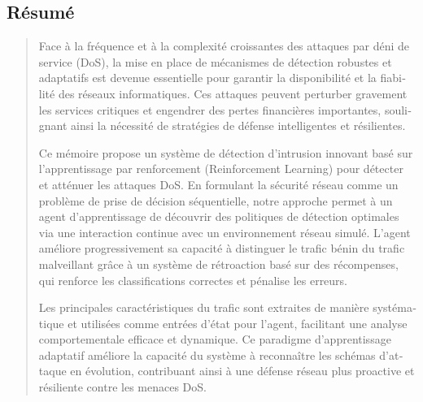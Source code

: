 \documentclass[16pt]{report}
\begin{document}
\newpage
\begin{otherlanguage}{french}
\chapter*{Résumé}

\begin{quote}
\large
Face à la fréquence et à la complexité croissantes des attaques par déni de service (DoS), la mise en place de mécanismes de détection robustes et adaptatifs est devenue essentielle pour garantir la disponibilité et la fiabilité des réseaux informatiques. Ces attaques peuvent perturber gravement les services critiques et engendrer des pertes financières importantes, soulignant ainsi la nécessité de stratégies de défense intelligentes et résilientes.

Ce mémoire propose un système de détection d’intrusion innovant basé sur l’apprentissage par renforcement (Reinforcement Learning) pour détecter et atténuer les attaques DoS. En formulant la sécurité réseau comme un problème de prise de décision séquentielle, notre approche permet à un agent d’apprentissage de découvrir des politiques de détection optimales via une interaction continue avec un environnement réseau simulé. L’agent améliore progressivement sa capacité à distinguer le trafic bénin du trafic malveillant grâce à un système de rétroaction basé sur des récompenses, qui renforce les classifications correctes et pénalise les erreurs.

Les principales caractéristiques du trafic sont extraites de manière systématique et utilisées comme entrées d’état pour l’agent, facilitant une analyse comportementale efficace et dynamique. Ce paradigme d’apprentissage adaptatif améliore la capacité du système à reconnaître les schémas d’attaque en évolution, contribuant ainsi à une défense réseau plus proactive et résiliente contre les menaces DoS.
\end{quote}

\vspace{1em}
\end{otherlanguage}


\tableofcontents
\newpage
\end{document}
